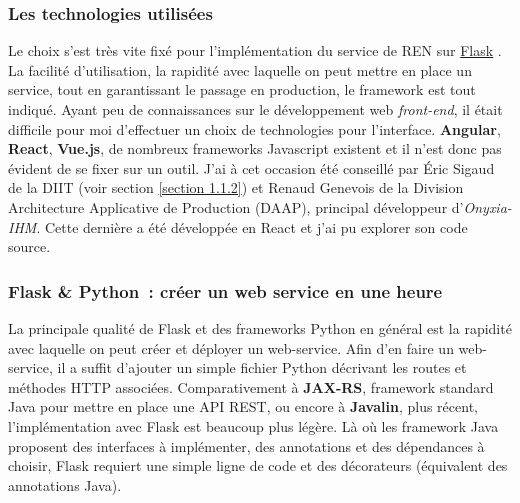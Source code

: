 \subsubsection{Les technologies utilisées}
Le choix s'est très vite fixé pour l'implémentation du service de REN sur \href{https://github.com/pallets/flask}{Flask} \cite{flask}. La facilité d'utilisation, la rapidité avec laquelle on peut mettre en place un service, tout en garantissant le passage en production, le framework est tout indiqué. Ayant peu de connaissances sur le développement web \textit{front-end}, il était difficile pour moi d'effectuer un choix de technologies pour l'interface. \textbf{Angular}, \textbf{React}, \textbf{Vue.js}, de nombreux frameworks Javascript existent et il n'est donc pas évident de se fixer sur un outil. J'ai à cet occasion été conseillé par Éric Sigaud de la DIIT (voir section \ref{section 1.1.2}) et Renaud Genevois de la Division Architecture Applicative de Production (DAAP), principal développeur d'\textit{Onyxia-IHM}. Cette dernière a été développée en React et j'ai pu explorer son code source.
\label{section 3.2.2}

\subsubsection*{Flask \& Python~: créer un web service en une heure}
La principale qualité de Flask et des frameworks Python en général est la rapidité avec laquelle on peut créer et déployer un web-service. Afin d'en faire un web-service, il a suffit d'ajouter un simple fichier Python décrivant les routes et méthodes HTTP associées. Comparativement à \textbf{JAX-RS}, framework standard Java pour mettre en place une API REST, ou encore à \textbf{Javalin}, plus récent, l'implémentation avec Flask est beaucoup plus légère. Là où les framework Java proposent des interfaces à implémenter, des annotations et des dépendances à choisir, Flask requiert une simple ligne de code et des décorateurs (équivalent des annotations Java).
\newline

